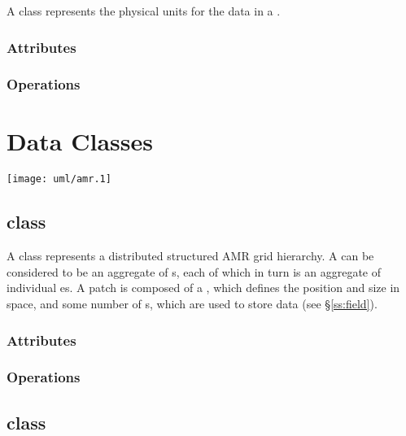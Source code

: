 A  class represents the physical units for the data in a
.

\subsection{Attributes}

\subsection{Operations}

\newpage

\chapter{Data Classes} \label{s:data-classes}

\centerline{\texttt{[image: uml/amr.1]}}

\section{ class}

A  class represents a distributed structured AMR grid
hierarchy.  A  can be considered to be an aggregate of
s, each of which in turn is an aggregate of individual
es.  A patch is composed of a , which defines
the position and size in space, and some number of s, which
are used to store  data (see \S\ref{ss:field}).



\subsection{Attributes}

\subsection{Operations}

\section{ class}

